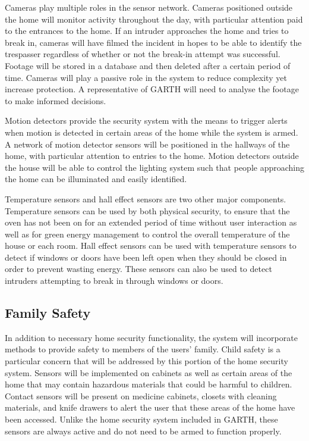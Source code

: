 \documentclass{report}
\begin{document}
Cameras play multiple roles in the sensor network. Cameras positioned outside
the home will monitor activity throughout the day, with particular attention paid
to the entrances to the home. If an intruder approaches the home and tries to
break in, cameras will have filmed the incident in hopes to be able to identify
the trespasser regardless of whether or not the break-in attempt was successful.
Footage will be stored in a database and then deleted after a certain period of
time. Cameras will play a passive role in the system to reduce complexity yet
increase protection. A representative of GARTH will need to analyse the footage
to make informed decisions.

Motion detectors provide the security system with the means to trigger alerts 
when motion is detected in certain areas of the home while the system is armed.
A network of motion detector sensors will be positioned in the hallways of the
home, with particular attention to entries to the home. Motion detectors
outside the house will be able to control the lighting system such that people
approaching the home can be illuminated and easily identified.

Temperature sensors and hall effect sensors are two other major components.
Temperature sensors can be used by both physical security, to ensure that the
oven has not been on for an extended period of time without user interaction as
well as for green energy management to control the overall temperature of the
house or each room. Hall effect sensors can be used with temperature sensors to
detect if windows or doors have been left open when they should be closed in
order to prevent wasting energy. These sensors can also be used to detect
intruders attempting to break in through windows or doors.

\subsection{Family Safety}

In addition to necessary home security functionality, the system will
incorporate methods to provide safety to members of the users' family. Child
safety is a particular concern that will be addressed by this portion of the
home security system. Sensors will be implemented on cabinets as well as
certain areas of the home that may contain hazardous materials that could be
harmful to children. Contact sensors will be present on medicine cabinets,
closets with cleaning materials, and knife drawers to alert the user that these
areas of the home have been accessed. Unlike the home security system
included in GARTH, these sensors are always active and do not need to be
armed to function properly. 
\end{document}
